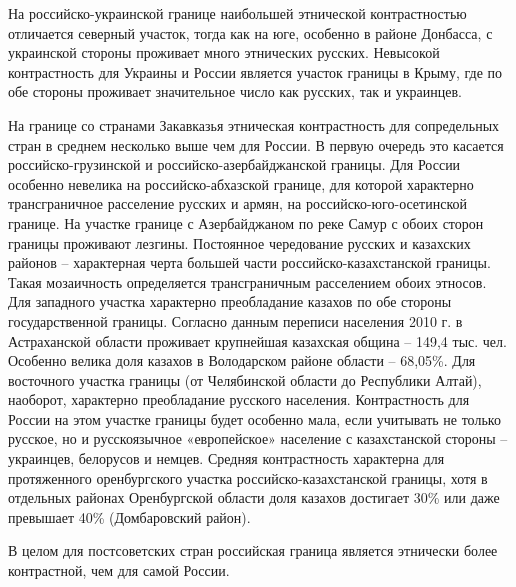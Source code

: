 \documentclass[]{book}
\begin{document}
На российско-украинской границе наибольшей этнической контрастностью
отличается северный участок, тогда как на юге, особенно в районе
Донбасса, с украинской стороны проживает много этнических русских.
Невысокой контрастность для Украины и России является участок границы в
Крыму, где по обе стороны проживает значительное число как русских, так
и украинцев.

На границе со странами Закавказья этническая контрастность для
сопредельных стран в среднем несколько выше чем для России. В первую
очередь это касается российско-грузинской и российско-азербайджанской
границы. Для России особенно невелика на российско-абхазской границе,
для которой характерно трансграничное расселение русских и армян, на
российско-юго-осетинской границе. На участке границе с Азербайджаном по
реке Самур с обоих сторон границы проживают лезгины. Постоянное
чередование русских и казахских районов -- характерная черта большей
части российско-казахстанской границы. Такая мозаичность определяется
трансграничным расселением обоих этносов. Для западного участка
характерно преобладание казахов по обе стороны государственной границы.
Согласно данным переписи населения 2010 г. в Астраханской области
проживает крупнейшая казахская община -- 149,4 тыс. чел. Особенно велика
доля казахов в Володарском районе области -- 68,05\%. Для восточного
участка границы (от Челябинской области до Республики Алтай), наоборот,
характерно преобладание русского населения. Контрастность для России на
этом участке границы будет особенно мала, если учитывать не только
русское, но и русскоязычное «европейское» население с казахстанской
стороны -- украинцев, белорусов и немцев. Средняя контрастность
характерна для протяженного оренбургского участка
российско-казахстанской границы, хотя в отдельных районах Оренбургской
области доля казахов достигает 30\% или даже превышает 40\%
(Домбаровский район).

В целом для постсоветских стран российская граница является этнически
более контрастной, чем для самой России.
\end{document}
